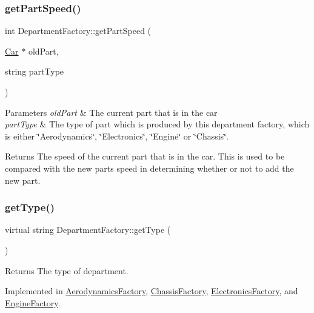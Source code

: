 \subsubsection{\texorpdfstring{get\+Part\+Speed()}{getPartSpeed()}}
{\footnotesize\ttfamily int Department\+Factory\+::get\+Part\+Speed (\begin{DoxyParamCaption}\item[{\hyperlink{classCar}{Car} $\ast$}]{old\+Part,  }\item[{string}]{part\+Type }\end{DoxyParamCaption})}


\begin{DoxyParams}{Parameters}
{\em old\+Part} & The current part that is in the car \\
\hline
{\em part\+Type} & The type of part which is produced by this department factory, which is either \char`\"{}\+Aerodynamics\char`\"{}, \char`\"{}\+Electronics\char`\"{}, \char`\"{}\+Engine\char`\"{} or \char`\"{}\+Chassis\char`\"{}.\\
\hline
\end{DoxyParams}
\begin{DoxyReturn}{Returns}
The speed of the current part that is in the car. This is used to be compared with the new part\textquotesingle{}s speed in determining whether or not to add the new part. 
\end{DoxyReturn}
\mbox{\label{classDepartmentFactory_a5aac775b89c4c390ad885e1de8947b0d}} 
\subsubsection{\texorpdfstring{get\+Type()}{getType()}}
{\footnotesize\ttfamily virtual string Department\+Factory\+::get\+Type (\begin{DoxyParamCaption}{ }\end{DoxyParamCaption})\hspace{0.3cm}{\ttfamily [pure virtual]}}

\begin{DoxyReturn}{Returns}
The type of department. 
\end{DoxyReturn}


Implemented in \hyperlink{classAerodynamicsFactory_a3b0af6c00d4a8549164b3d5ec9a1f256}{Aerodynamics\+Factory}, \hyperlink{classChassisFactory_af038789501da489aeccb19520dc09686}{Chassis\+Factory}, \hyperlink{classElectronicsFactory_a494fea1f1a55bca20ce1bb4c988d9d44}{Electronics\+Factory}, and \hyperlink{classEngineFactory_a52fd49ea32ab2dc62aa8c86e058fb138}{Engine\+Factory}.

